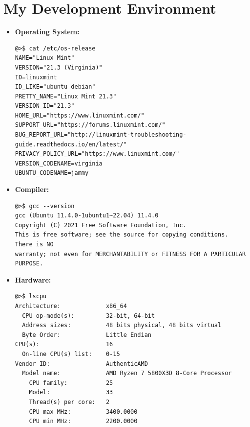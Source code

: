 \documentclass[11pt,a4paper]{report}
\theoremstyle{definitionstyle}
\begin{document}
\section{My Development Environment}

\begin{itemize}
	\item \textbf{Operating System:} 
\begin{verbatim}
@>$ cat /etc/os-release
NAME="Linux Mint"
VERSION="21.3 (Virginia)"
ID=linuxmint
ID_LIKE="ubuntu debian"
PRETTY_NAME="Linux Mint 21.3"
VERSION_ID="21.3"
HOME_URL="https://www.linuxmint.com/"
SUPPORT_URL="https://forums.linuxmint.com/"
BUG_REPORT_URL="http://linuxmint-troubleshooting-guide.readthedocs.io/en/latest/"
PRIVACY_POLICY_URL="https://www.linuxmint.com/"
VERSION_CODENAME=virginia
UBUNTU_CODENAME=jammy

\end{verbatim}
	
	\item \textbf{Compiler:} 
\begin{verbatim}
@>$	gcc --version
gcc (Ubuntu 11.4.0-1ubuntu1~22.04) 11.4.0
Copyright (C) 2021 Free Software Foundation, Inc.
This is free software; see the source for copying conditions.  There is NO
warranty; not even for MERCHANTABILITY or FITNESS FOR A PARTICULAR PURPOSE.
\end{verbatim}
	\item \textbf{Hardware:} 
\begin{verbatim}
@>$ lscpu
Architecture:             x86_64
  CPU op-mode(s):         32-bit, 64-bit
  Address sizes:          48 bits physical, 48 bits virtual
  Byte Order:             Little Endian
CPU(s):                   16
  On-line CPU(s) list:    0-15
Vendor ID:                AuthenticAMD
  Model name:             AMD Ryzen 7 5800X3D 8-Core Processor
    CPU family:           25
    Model:                33
    Thread(s) per core:   2
    CPU max MHz:          3400.0000
    CPU min MHz:          2200.0000


\end{verbatim}
\end{itemize}
\end{document}
